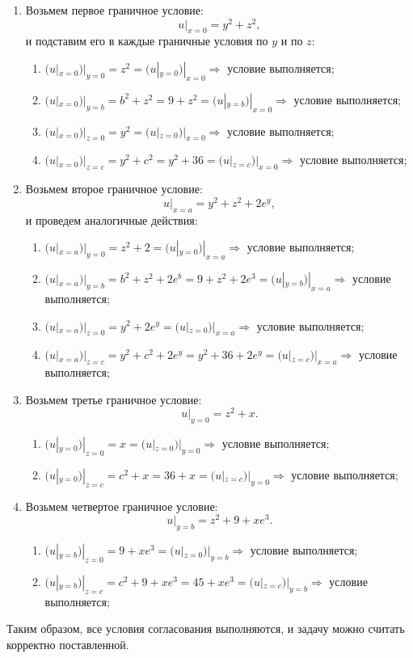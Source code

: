 \documentclass[11pt]{article}
\begin{document}
\begin{enumerate}
    \item Возьмем первое граничное условие:
$$u|_{x=0}=y^2+z^2,$$
и подставим его в каждые граничные условия по $y$ и по $z$:
    \begin{enumerate}
        \item $(u|_{x=0})|_{y=0}=z^2=(u|_{y=0})|_{x=0}\Rightarrow$ условие выполняется;
        \item $(u|_{x=0})|_{y=b}=b^2+z^2=9+z^2=(u|_{y=b})|_{x=0}\Rightarrow$ условие выполняется;
        \item $(u|_{x=0})|_{z=0}=y^2=(u|_{z=0})|_{x=0}\Rightarrow$ условие выполняется;
        \item $(u|_{x=0})|_{z=c}=y^2+c^2=y^2+36=(u|_{z=c})|_{x=0}\Rightarrow$ условие выполняется;
    \end{enumerate}
    \item Возьмем второе граничное условие: 
    $$u|_{x=a}=y^2+z^2+2e^y,$$ 
    и проведем аналогичные действия:
    \begin{enumerate}
        \item $(u|_{x=a})|_{y=0}=z^2+2=(u|_{y=0})|_{x=a}\Rightarrow$ условие выполняется;
        \item $(u|_{x=a})|_{y=b}=b^2+z^2+2e^b=9+z^2+2e^3=(u|_{y=b})|_{x=a}\Rightarrow$ условие выполняется;
        \item $(u|_{x=a})|_{z=0}=y^2+2e^y=(u|_{z=0})|_{x=a}\Rightarrow$ условие выполняется;
        \item $(u|_{x=a})|_{z=c}=y^2+c^2+2e^y=y^2+36+2e^y=(u|_{z=c})|_{x=a}\Rightarrow$ условие выполняется;
    \end{enumerate}
    \item Возьмем третье граничное условие:
    $$u|_{y=0}=z^2+x.$$
    \begin{enumerate}
        \item $(u|_{y=0})|_{z=0}=x=(u|_{z=0})|_{y=0}\Rightarrow$ условие выполняется;
        \item $(u|_{y=0})|_{z=c}=c^2+x=36+x=(u|_{z=c})|_{y=0}\Rightarrow$ условие выполняется;
    \end{enumerate}
    \item Возьмем четвертое граничное условие:
    $$u|_{y=b}=z^2+9+xe^3.$$
    \begin{enumerate}
        \item $(u|_{y=b})|_{z=0}=9+xe^3=(u|_{z=0})|_{y=b}\Rightarrow$ условие выполняется;
        \item $(u|_{y=b})|_{z=c}=c^2+9+xe^3=45+xe^3=(u|_{z=c})|_{y=b}\Rightarrow$ условие выполняется;
    \end{enumerate}
\end{enumerate}
Таким образом, все условия согласования выполняются, и задачу можно считать корректно поставленной.
\end{document}
